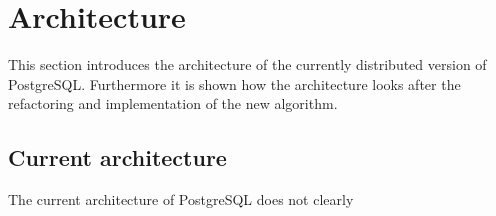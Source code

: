 \section{Architecture}
%
This section introduces the architecture of the currently distributed version of PostgreSQL.
%
Furthermore it is shown how the architecture looks after the refactoring and implementation of the new algorithm.
%
\subsection{Current architecture}
%
The current architecture of PostgreSQL does not clearly 